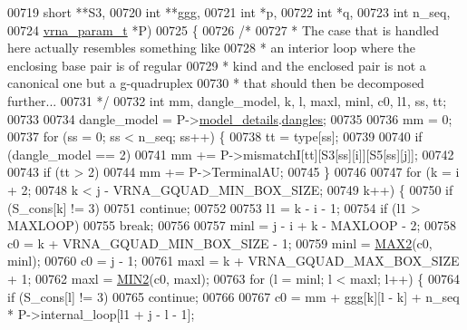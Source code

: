 \begin{DoxyCode}
00719                                       \textcolor{keywordtype}{short}         **S3,
00720                                       \textcolor{keywordtype}{int}           **ggg,
00721                                       \textcolor{keywordtype}{int}           *p,
00722                                       \textcolor{keywordtype}{int}           *q,
00723                                       \textcolor{keywordtype}{int}           n\_seq,
00724                                       \hyperlink{group__energy__parameters_structvrna__param__s}{vrna\_param\_t}  *P)
00725 \{
00726   \textcolor{comment}{/*}
00727 \textcolor{comment}{   * The case that is handled here actually resembles something like}
00728 \textcolor{comment}{   * an interior loop where the enclosing base pair is of regular}
00729 \textcolor{comment}{   * kind and the enclosed pair is not a canonical one but a g-quadruplex}
00730 \textcolor{comment}{   * that should then be decomposed further...}
00731 \textcolor{comment}{   */}
00732   \textcolor{keywordtype}{int} mm, dangle\_model, k, l, maxl, minl, c0, l1, ss, tt;
00733 
00734   dangle\_model = P->\hyperlink{group__energy__parameters_a7b84353eb9075c595bad4ceb871bcae7}{model\_details}.\hyperlink{group__model__details_adcda4ff2ea77748ae0e8700288282efc}{dangles};
00735 
00736   mm = 0;
00737   \textcolor{keywordflow}{for} (ss = 0; ss < n\_seq; ss++) \{
00738     tt = type[ss];
00739 
00740     \textcolor{keywordflow}{if} (dangle\_model == 2)
00741       mm += P->mismatchI[tt][S3[ss][i]][S5[ss][j]];
00742 
00743     \textcolor{keywordflow}{if} (tt > 2)
00744       mm += P->TerminalAU;
00745   \}
00746 
00747   \textcolor{keywordflow}{for} (k = i + 2;
00748        k < j - VRNA\_GQUAD\_MIN\_BOX\_SIZE;
00749        k++) \{
00750     \textcolor{keywordflow}{if} (S\_cons[k] != 3)
00751       \textcolor{keywordflow}{continue};
00752 
00753     l1 = k - i - 1;
00754     \textcolor{keywordflow}{if} (l1 > MAXLOOP)
00755       \textcolor{keywordflow}{break};
00756 
00757     minl  = j - i + k - MAXLOOP - 2;
00758     c0    = k + VRNA\_GQUAD\_MIN\_BOX\_SIZE - 1;
00759     minl  = \hyperlink{group__utils_ga33297b3679c713b0c4d897cd0fe3b122}{MAX2}(c0, minl);
00760     c0    = j - 1;
00761     maxl  = k + VRNA\_GQUAD\_MAX\_BOX\_SIZE + 1;
00762     maxl  = \hyperlink{group__utils_gae0b9cd0ce090bd69b951aa73e8fa4f7d}{MIN2}(c0, maxl);
00763     \textcolor{keywordflow}{for} (l = minl; l < maxl; l++) \{
00764       \textcolor{keywordflow}{if} (S\_cons[l] != 3)
00765         \textcolor{keywordflow}{continue};
00766 
00767       c0 = mm + ggg[k][l - k] + n\_seq * P->internal\_loop[l1 + j - l - 1];

\end{DoxyCode}
